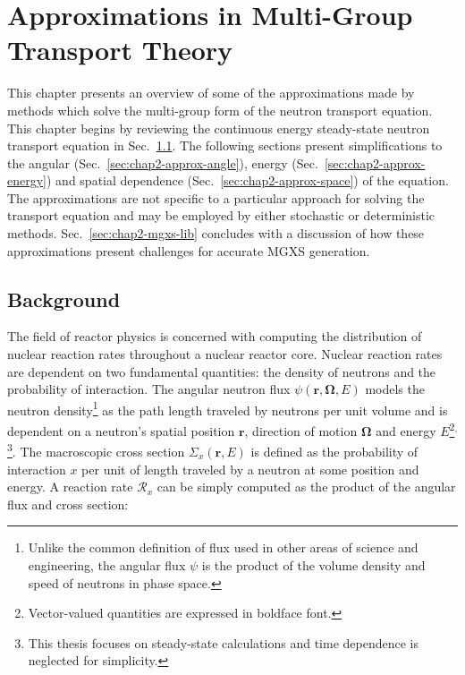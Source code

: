 \chapter{Approximations in Multi-Group Transport Theory}
\label{chap:mgxs}

This chapter presents an overview of some of the approximations made by methods which solve the multi-group form of the neutron transport equation. This chapter begins by reviewing the continuous energy steady-state neutron transport equation in Sec.~\ref{sec:chap2-background}. The following sections present simplifications to the angular (Sec.~\ref{sec:chap2-approx-angle}), energy (Sec.~\ref{sec:chap2-approx-energy}) and spatial dependence (Sec.~\ref{sec:chap2-approx-space}) of the equation. The approximations are not specific to a particular approach for solving the transport equation and may be employed by either stochastic or deterministic methods. Sec.~\ref{sec:chap2-mgxs-lib} concludes with a discussion of how these approximations present challenges for accurate \ac{MGXS} generation.


\section{Background}
\label{sec:chap2-background}

The field of reactor physics is concerned with computing the distribution of nuclear reaction rates throughout a nuclear reactor core. Nuclear reaction rates are dependent on two fundamental quantities: the density of neutrons and the probability of interaction. The angular neutron flux $\psi(\mathbf{r},\mathbf{\Omega},E)$ models the neutron density\footnote{Unlike the common definition of flux used in other areas of science and engineering, the angular flux $\psi$ is the product of the volume density and speed of neutrons in phase space.} as the path length traveled by neutrons per unit volume and is dependent on a neutron's spatial position $\mathbf{r}$, direction of motion $\mathbf{\Omega}$ and energy $E$\footnote{Vector-valued quantities are expressed in boldface font.}$^{,}$\footnote{This thesis focuses on steady-state calculations and time dependence is neglected for simplicity.}. The macroscopic cross section $\Sigma_{x}(\mathbf{r},E)$ is defined as the probability of interaction $x$ per unit of length traveled by a neutron at some position and energy. A reaction rate $\mathcal{R}_{x}$ can be simply computed as the product of the angular flux and cross section:

